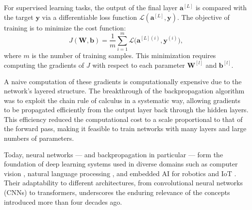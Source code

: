     For supervised learning tasks, the output of the final layer $\mathbf{a}^{[L]}$ is compared with the target $\mathbf{y}$ via a differentiable loss function $\mathcal{L}(\mathbf{a}^{[L]}, \mathbf{y})$. The objective of training is to minimize the cost function:
    \begin{equation}
        J(\mathbf{W}, \mathbf{b}) = \frac{1}{m} \sum_{i=1}^m \mathcal{L}\big( \mathbf{a}^{[L](i)}, \mathbf{y}^{(i)} \big),
        \end{equation}
where $m$ is the number of training samples. This minimization requires computing the gradients of $J$ with respect to each parameter $\mathbf{W}^{[l]}$ and $\mathbf{b}^{[l]}$. 

A naive computation of these gradients is computationally expensive due to the network's layered structure. The breakthrough of the backpropagation algorithm \cite{rumelhart1986learning} was to exploit the chain rule of calculus in a systematic way, allowing gradients to be propagated efficiently from the output layer back through the hidden layers. This efficiency reduced the computational cost to a scale proportional to that of the forward pass, making it feasible to train networks with many layers and large numbers of parameters.

Today, neural networks — and backpropagation in particular — form the foundation of deep learning systems used in diverse domains such as computer vision \cite{lecun1998gradient}, natural language processing \cite{vaswani2017attention}, and embedded AI for robotics and IoT \cite{lane2017squeezing}. Their adaptability to different architectures, from convolutional neural networks (CNNs) to transformers, underscores the enduring relevance of the concepts introduced more than four decades ago.


